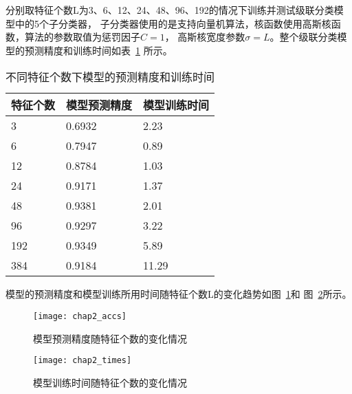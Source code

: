 分别取特征个数L为3、6、12、24、48、96、192的情况下训练并测试级联分类模型中的5个子分类器，
子分类器使用的是支持向量机算法，核函数使用高斯核函数，算法的参数取值为惩罚因子$C=1$，
高斯核宽度参数$\sigma=L$。整个级联分类模型的预测精度和训练时间如表~\ref{tab:chap2_acc_time}
所示。
\begin{table}[htb]
  \centering
  \begin{minipage}[t]{0.6\linewidth} %
  \caption{不同特征个数下模型的预测精度和训练时间}
  \label{tab:chap2_acc_time}
    \begin{tabularx}{\linewidth}{lXX}
      \toprule[1.5pt]
      特征个数 & 模型预测精度 & 模型训练时间 \\\midrule[1pt]
      3   &  0.6932 & 2.23  \\
      6   &  0.7947 & 0.89  \\
      12  &  0.8784 & 1.03  \\
      24  &  0.9171 & 1.37  \\
      48  &  0.9381 & 2.01  \\
      96  &  0.9297 & 3.22  \\
      192 &  0.9349 & 5.89  \\
      384 &  0.9184 & 11.29 \\
      \bottomrule[1.5pt]
    \end{tabularx}
  \end{minipage}
\end{table}

模型的预测精度和模型训练所用时间随特征个数L的变化趋势如图~\ref{fig:chap2_accs}和
图~\ref{fig:chap2_times}所示。
\begin{figure}[ht] %
  \centering
  \texttt{[image: chap2\_accs]}
  \caption{模型预测精度随特征个数的变化情况}
  \label{fig:chap2_accs}
\end{figure}

\begin{figure}[ht] %
  \centering
  \texttt{[image: chap2\_times]}
  \caption{模型训练时间随特征个数的变化情况}
  \label{fig:chap2_times}
\end{figure}

